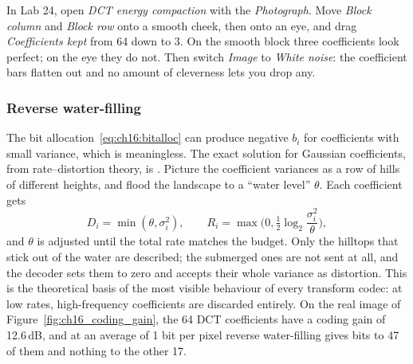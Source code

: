 
\begin{tryit}
In Lab 24, open \emph{DCT energy compaction} with the \emph{Photograph}. Move \emph{Block column}
and \emph{Block row} onto a smooth cheek, then onto an eye, and drag \emph{Coefficients kept}
from 64 down to 3. On the smooth block three coefficients look perfect; on the eye they do not.
Then switch \emph{Image} to \emph{White noise}: the coefficient bars flatten out and no amount of
cleverness lets you drop any.
\end{tryit}

\subsubsection{Reverse water-filling}

The bit allocation~\eqref{eq:ch16:bitalloc} can produce negative $b_i$ for coefficients with small
variance, which is meaningless. The exact solution for Gaussian coefficients, from rate--distortion
theory, is . Picture the coefficient variances as a row of hills of
different heights, and flood the landscape to a ``water level'' $\theta$. Each coefficient gets
\begin{equation}
D_i=\min(\theta,\sigma_i^2),\qquad R_i=\max\!\Big(0,\tfrac12\log_2\frac{\sigma_i^2}{\theta}\Big),
\label{eq:ch16:reversewf}
\end{equation}
and $\theta$ is adjusted until the total rate matches the budget. Only the hilltops that stick out
of the water are described; the submerged ones are not sent at all, and the decoder sets them to
zero and accepts their whole variance as distortion. This is the theoretical basis of the most
visible behaviour of every transform codec: at low rates, high-frequency coefficients are discarded
entirely. On the real image of Figure~\ref{fig:ch16_coding_gain}, the 64 DCT coefficients have a
coding gain of 12.6\,dB, and at an average of 1 bit per pixel reverse water-filling gives bits to
47 of them and nothing to the other 17.

